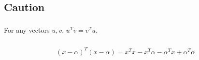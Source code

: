 \documentclass[a4paper,10.5pt]{jsarticle}  %
\begin{document}
\subsection{Caution}
\subsubsection{}
For any vectors $u, v$, $u^Tv = v^Tu$.

\subsubsection{}
\begin{align*}
  (x-\alpha)^T (x-\alpha) = x^T x - x^T \alpha - \alpha^T x + \alpha^T \alpha 
\end{align*}
\end{document}
